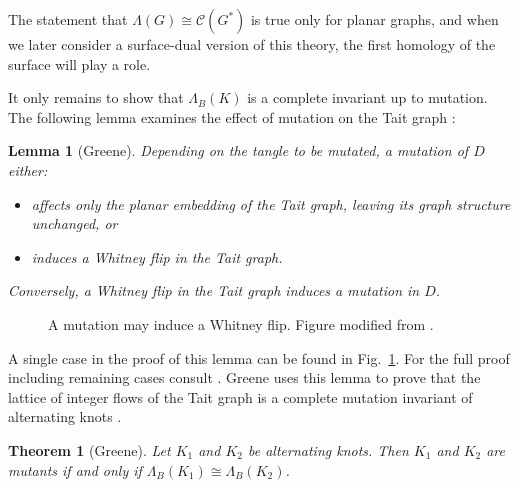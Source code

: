 \documentclass[12pt]{report}
\newtheorem*{theorem}{Theorem}
\newtheorem*{lemma}{Lemma}
\theoremstyle{upright}
\begin{document}
The statement that $\Lambda(G) \cong \mathcal{C}(G^{*})$ is true only for planar graphs, and when we later consider a surface-dual version of this theory, the first homology of the surface will play a role.

It only remains to show that $\Lambda_{B}(K)$ is a complete invariant up to mutation. The following lemma examines the effect of mutation on the Tait graph \cite[Lemma 4.5]{lattices-graphs-mutation}:

\begin{lemma}[Greene]
Depending on the tangle to be mutated, a mutation of $D$ either:
\begin{itemize}
\item affects only the planar embedding of the Tait graph, leaving its graph structure unchanged, or
\item induces a Whitney flip in the Tait graph.
\end{itemize}
Conversely, a Whitney flip in the Tait graph induces a mutation in $D$.
\end{lemma}

\begin{figure}[hbt!]
	\centering
	\def\svgscale{0.65}
	
	
	\caption{A mutation may induce a Whitney flip. Figure modified from \cite[Fig.~2]{lattices-graphs-mutation}.}
	\label{fig:mutation-whitney-flip}
\end{figure}

A single case in the proof of this lemma can be found in Fig.~\ref{fig:mutation-whitney-flip}. For the full proof including remaining cases consult \cite[Fig. 2-4]{lattices-graphs-mutation}. Greene uses this lemma to prove that the lattice of integer flows of the Tait graph is a complete mutation invariant of alternating knots \cite[Proposition 4.4]{lattices-graphs-mutation}.

\begin{theorem}[Greene]
Let $K_{1}$ and $K_{2}$ be alternating knots. Then $K_{1}$ and $K_{2}$ are mutants if and only if  $\Lambda_{B}(K_{1}) \cong \Lambda_{B}(K_{2})$.
\end{theorem}
\end{document}
